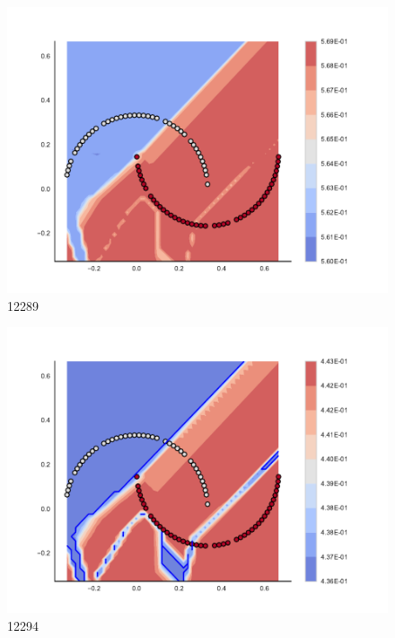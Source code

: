\begin{subfigure}[b]{0.09\textwidth}
    \includegraphics[clip, trim=2.35cm 1.75cm 4.5cm 0cm,width=\textwidth]{img/convergence/12289.pdf}
    \caption{12289}
    \label{fig:convergence_12289}
\end{subfigure}
%
\begin{subfigure}[b]{0.09\textwidth}
    \includegraphics[clip, trim=2.35cm 1.75cm 4.5cm 0cm,width=\textwidth]{img/convergence/12294.pdf}
    \caption{12294}
    \label{fig:convergence_12294}
\end{subfigure}
%

